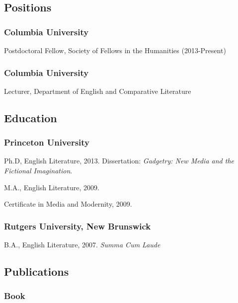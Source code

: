 \documentclass[11pt]{article}
\begin{document}
\bigskip\bigskip\medskip
{}
\reversemarginpar
\bigskip 

\subsection{Positions}

\subsubsection{Columbia University}
\ind Postdoctoral Fellow, Society of Fellows in the Humanities (2013-Present)
\medskip
\subsubsection{Columbia University}
\ind Lecturer, Department of English and Comparative Literature

\medskip

\subsection{Education}

\subsubsection{Princeton University}

\ind Ph.D, English Literature, 2013. Dissertation: \emph{Gadgetry: New Media and the Fictional Imagination}. 

\ind M.A., English Literature, 2009.

\ind Certificate in Media and Modernity, 2009. %

\medskip
\subsubsection{Rutgers University, New Brunswick}

\ind B.A., English Literature, 2007. \emph{Summa Cum Laude} %

\medskip

\subsection{Publications}

\subsubsection{Book}
\end{document}
